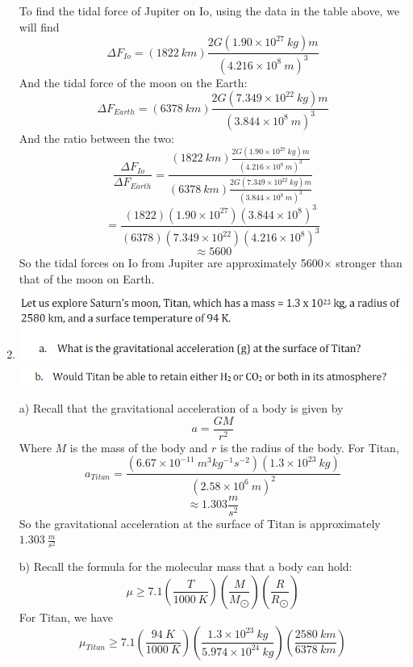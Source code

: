 \documentclass{article}
\begin{document}
\begin{enumerate}
    To find the tidal force of Jupiter on Io, using the data in the table above, we will find
    \[\Delta F_{Io} = (1822 \:km)\frac{2G(1.90 \times 10^{27} \: kg)m}{(4.216 \times 10^8 \:m)^3}\]
    And the tidal force of the moon on the Earth:
    \[\Delta F_{Earth} = (6378 \:km) \frac{2G(7.349 \times 10^{22} \:kg)m}{(3.844 \times 10^8 \:m)^3}\]
    And the ratio between the two:
    \[\frac{\Delta F_{Io}}{\Delta F_{Earth}} = \frac{(1822 \:km)\frac{2G(1.90 \times 10^{27} \:kg)m}{(4.216 \times 10^8 \:m)^3}}{(6378 \:km)\frac{2G(7.349 \times 10^22 \:kg)m}{(3.844 \times 10^8 \:m)^3}}\]
    \[ = \frac{(1822)(1.90 \times 10^{27})(3.844 \times 10^8)^3}{(6378)(7.349 \times 10^{22})(4.216 \times 10^8)^3}\]
    \[\approx 5600\]
    So the tidal forces on Io from Jupiter are approximately 5600$\times$ stronger than that of the moon on Earth.
    
    \item \includegraphics[scale = 0.85]{probset5prob3.PNG} \newline
    \includegraphics[scale = 0.85]{probset5prob3_1.PNG}
    
    a) Recall that the gravitational acceleration of a body is given by
    \begin{equation}
        a = \frac{GM}{r^2}
    \end{equation}
    Where $M$ is the mass of the body and $r$ is the radius of the body.
    For Titan,
    \[a_{Titan} = \frac{(6.67 \times 10^{-11} \:m^3 kg^{-1} s^{-2})(1.3 \times 10^{23} \:kg)}{(2.58 \times 10^6 \:m)^2}\]
    \[\approx 1.303 \frac{m}{s^2}\]
    So the gravitational acceleration at the surface of Titan is approximately $1.303 \: \frac{m}{s^2}$
    
    b) Recall the formula for the molecular mass that a body can hold:
    \begin{equation}
        \mu \geq 7.1(\frac{T}{1000 \:K})(\frac{M}{M_{\bigodot}})(\frac{R}{R_{\bigodot}})
    \end{equation}
    For Titan, we have
    \[\mu_{Titan} \geq 7.1(\frac{94 \:K}{1000 \:K})(\frac{1.3 \times 10^{23} \:kg}{5.974 \times 10^{24} \:kg})(\frac{2580 \:km}{6378 \:km})\]
    

\end{enumerate}
\end{document}
